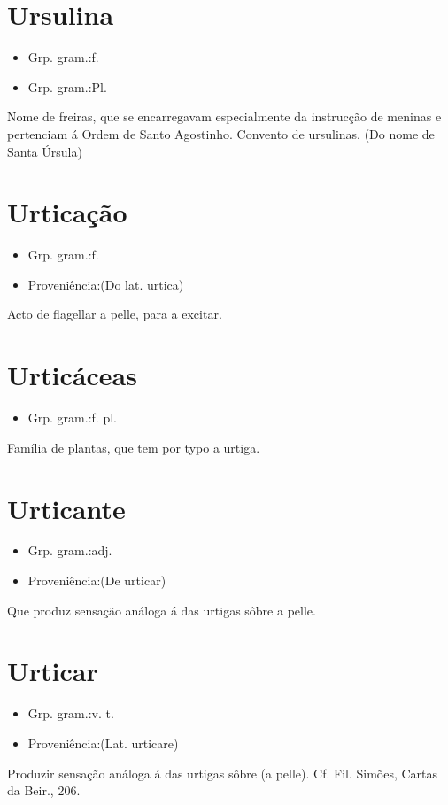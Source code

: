 \documentclass{article}
\begin{document}
\section{Ursulina}
\begin{itemize}
\item {Grp. gram.:f.}
\end{itemize}
\begin{itemize}
\item {Grp. gram.:Pl.}
\end{itemize}
Nome de freiras, que se encarregavam especialmente da instrucção de meninas e pertenciam á Ordem de Santo Agostinho.
Convento de ursulinas.
(Do nome de Santa \textunderscore Úrsula\textunderscore )
\section{Urticação}
\begin{itemize}
\item {Grp. gram.:f.}
\end{itemize}
\begin{itemize}
\item {Proveniência:(Do lat. \textunderscore urtica\textunderscore )}
\end{itemize}
Acto de flagellar a pelle, para a excitar.
\section{Urticáceas}
\begin{itemize}
\item {Grp. gram.:f. pl.}
\end{itemize}
Família de plantas, que tem por typo a urtiga.
\section{Urticante}
\begin{itemize}
\item {Grp. gram.:adj.}
\end{itemize}
\begin{itemize}
\item {Proveniência:(De \textunderscore urticar\textunderscore )}
\end{itemize}
Que produz sensação análoga á das urtigas sôbre a pelle.
\section{Urticar}
\begin{itemize}
\item {Grp. gram.:v. t.}
\end{itemize}
\begin{itemize}
\item {Proveniência:(Lat. \textunderscore urticare\textunderscore )}
\end{itemize}
Produzir sensação análoga á das urtigas sôbre (a pelle). Cf. Fil. Simões, \textunderscore Cartas da Beir.\textunderscore , 206.
\end{document}
